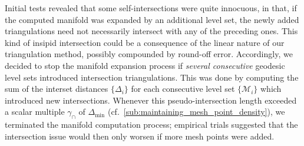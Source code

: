 

Initial tests revealed that some self-intersections were quite innocuous, in
that, if the computed manifold was expanded by an additional level set,
the newly added triangulations need not necessarily intersect with any of the
preceding ones. This kind of insipid intersection could be a consequence of
the linear nature of our triangulation method, possibly compounded by round-off
error. Accordingly, we decided to stop the manifold expansion process
if \emph{several consecutive} geodesic level sets introduced intersection
triangulations. This was done by computing the sum of the interset distances
$\{\Delta_{i}\}$ for each consecutive level set $\{\mathcal{M}_{i}\}$ which
introduced new intersections. Whenever this pseudo-intersection length
exceeded a scalar multiple $\gamma_{\cap}$ of $\Delta_{\min}$ (cf.\
\cref{sub:maintaining_mesh_point_density}),
we terminated the manifold computation process; empirical trials suggested
that the intersection issue would then only worsen if more mesh points were
added.

